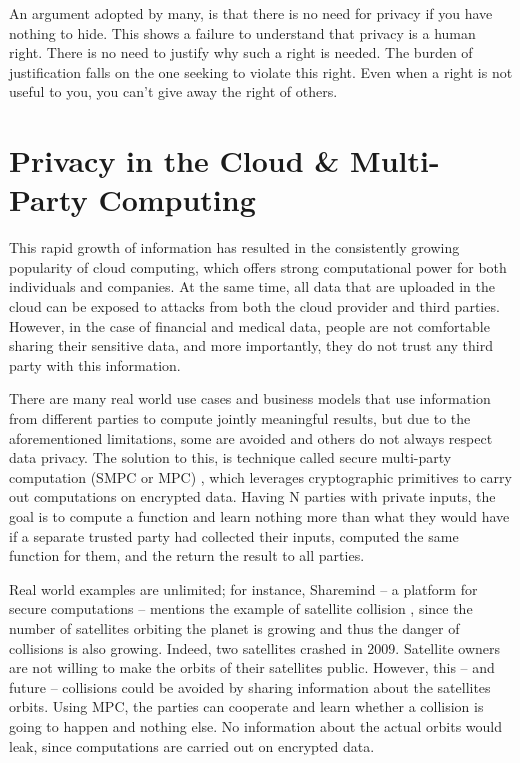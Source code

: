 An argument adopted by many, is that there is no need for privacy if you have nothing to hide.
This shows a failure to understand that privacy is a human right.
There is no need to justify why such a right is needed.
The burden of justification falls on the one seeking to violate this right.
Even when a right is not useful to you, you can't give away the right of others.



\section{Privacy in the Cloud \& Multi-Party Computing}\label{s:privacy-cloud-multiparty}

This rapid growth of information has resulted in the consistently growing popularity of cloud computing, which offers strong computational power for both individuals and companies.
At the same time, all data that are uploaded in the cloud can be exposed to attacks from both the cloud provider and third parties.
However, in the case of financial and medical data, people are not comfortable sharing their sensitive data, and more importantly, they do not trust any third party with this information.

There are many real world use cases and business models that use information from different parties to compute jointly meaningful results, but due to the aforementioned limitations, some are avoided and others do not always respect data privacy.
The solution to this, is technique called secure multi-party computation (SMPC or MPC) \cite{yao1982protocols, goldreich1998secure}, which leverages cryptographic primitives to carry out computations on encrypted data.
Having N parties with private inputs, the goal is to compute a function and learn nothing more than what they would have if a separate trusted party had collected their inputs, computed the same function for them, and the return the result to all parties.

Real world examples are unlimited; for instance, Sharemind \cite{bogdanov2008sharemind} -- a platform for secure computations -- mentions the example of satellite collision \cite{kamm2015secure}, since the number of satellites orbiting the planet is growing and thus the danger of collisions is also growing.
Indeed, two satellites crashed in 2009.
Satellite owners are not willing to make the orbits of their satellites public.
However, this -- and future -- collisions could be avoided by sharing information about the satellites orbits.
Using MPC, the parties can cooperate and learn whether a collision is going to happen and nothing else.
No information about the actual orbits would leak, since computations are carried out on encrypted data.


